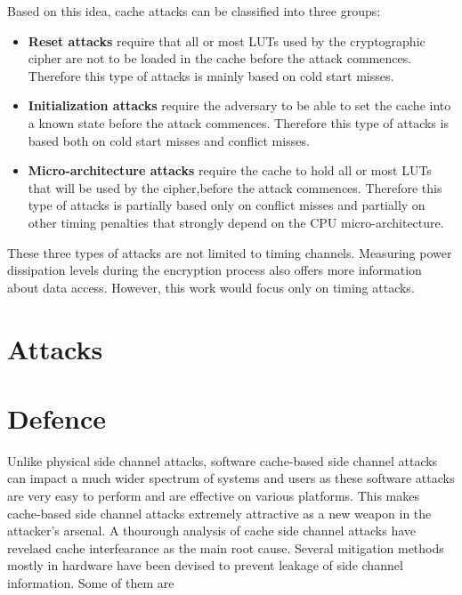 \documentclass[twocolumn]{IEEEtran}
\begin{document}
Based on this idea, cache attacks can be classified into three groups:

\begin {itemize}

\item \textbf{Reset attacks} require that all or most LUTs used by the cryptographic cipher are not to be loaded in the cache before the attack commences. Therefore this type of attacks is mainly based on cold start misses.

\item \textbf{Initialization attacks} require the adversary to be able to set the cache into a known state before the attack commences. Therefore this type of attacks is based both on cold start misses and conflict misses.

\item \textbf{Micro-architecture attacks} require the cache to hold all or most LUTs that will be used by the cipher,before the attack commences. Therefore this type of attacks is partially based only on conflict misses and partially on other timing penalties that
strongly depend on the CPU micro-architecture. 

\end {itemize}

These three types of attacks are not limited to timing channels. Measuring power dissipation levels during the encryption process also offers more information about data access. However, this work would focus only on timing attacks.

\section {Attacks}

\section {Defence}

Unlike physical side channel attacks, software cache-based side channel  attacks can impact a much wider spectrum of systems and users as these software attacks are very easy to perform and are effective on various platforms. This makes cache-based side channel attacks extremely attractive as a new weapon in the attacker’s arsenal. A thourough analysis of cache side channel attacks have revelaed cache interfearance as the main root cause. Several mitigation methods mostly in hardware have been devised to prevent leakage of side channel information. Some of them are
\end{document}
